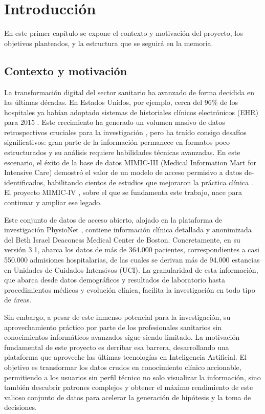 \chapter{Introducción}

En este primer capítulo se expone el contexto y motivación del proyecto, los objetivos planteados, y la estructura que se seguirá en la memoria.

\section{Contexto y motivación}

La transformación digital del sector sanitario ha avanzado de forma decidida en las últimas décadas. En Estados Unidos, por ejemplo, cerca del 96\% de los hospitales ya habían adoptado sistemas de historiales clínicos electrónicos (EHR) para 2015 \cite{Henry2016_EHR}. Este crecimiento ha generado un volumen masivo de datos retrospectivos cruciales para la investigación \cite{Halevy2009_data}, pero ha traído consigo desafíos significativos: gran parte de la información permanece en formatos poco estructurados y su análisis requiere habilidades técnicas avanzadas. En este escenario, el éxito de la base de datos MIMIC-III (Medical Information Mart for Intensive Care) demostró el valor de un modelo de acceso permisivo a datos de-identificados, habilitando cientos de estudios que mejoraron la práctica clínica \cite{MIMICIII_paper}. El proyecto MIMIC-IV \cite{MIMICIV_paper, MIMICIV_dataset}, sobre el que se fundamenta este trabajo, nace para continuar y ampliar ese legado.

Este conjunto de datos de acceso abierto, alojado en la plataforma de investigación PhysioNet \cite{PhysioNet_paper}, contiene información clínica detallada y anonimizada del Beth Israel Deaconess Medical Center de Boston. Concretamente, en su versión 3.1, abarca los datos de más de 364.000 pacientes, correspondientes a casi 550.000 admisiones hospitalarias, de las cuales se derivan más de 94.000 estancias en Unidades de Cuidados Intensivos (UCI). La granularidad de esta información, que abarca desde datos demográficos y resultados de laboratorio hasta procedimientos médicos y evolución clínica, facilita la investigación en todo tipo de áreas.

Sin embargo, a pesar de este inmenso potencial para la investigación, su aprovechamiento práctico por parte de los profesionales sanitarios sin conocimientos informáticos avanzados sigue siendo limitado. La motivación fundamental de este proyecto es derribar esa barrera, desarrollando una plataforma que aproveche las últimas tecnologías en Inteligencia Artificial. El objetivo es transformar los datos crudos en conocimiento clínico accionable, permitiendo a los usuarios sin perfil técnico no solo visualizar la información, sino también descubrir patrones complejos y obtener el máximo rendimiento de este valioso conjunto de datos para acelerar la generación de hipótesis y la toma de decisiones.

